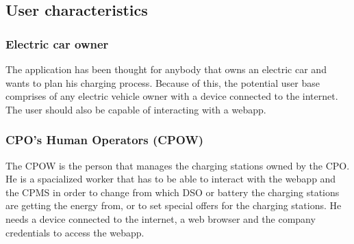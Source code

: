 \documentclass[table, 12pt]{article} %
\begin{document}
    \newpage
    \subsection{User characteristics}
    \subsubsection{Electric car owner}
    The application has been thought for anybody that owns an electric car and wants to plan his charging process. 
    Because of this, the potential user base comprises of any electric vehicle owner with a device connected to the internet.
    The user should also be capable of interacting with a webapp.
    
    \subsubsection{CPO's Human Operators (CPOW)}
    The CPOW is the person that manages the charging stations owned by the CPO.\\
    He is a spacialized worker that has to be able to interact with the webapp and the CPMS in order to change from which DSO or battery the charging stations are getting the energy from, or to set special offers for the charging stations.
    He needs a device connected to the internet, a web browser and the company credentials to access the webapp.
\end{document}
